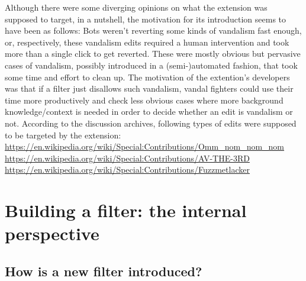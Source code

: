 Although there were some diverging opinions on what the extension was supposed to target, in a nutshell, the motivation for its introduction seems to have been as follows:
Bots weren't reverting some kinds of vandalism fast enough, or, respectively, these vandalism edits required a human intervention and took more than a single click to get reverted.
These were mostly obvious but pervasive cases of vandalism, possibly introduced in a (semi-)automated fashion, that took some time and effort to clean up.
The motivation of the extention's developers was that if a filter just disallows such vandalism, vandal fighters could use their time more productively and check less obvious cases where more background knowledge/context is needed in order to decide whether an edit is vandalism or not.
According to the discussion archives, following types of edits were supposed to be targeted by the extension:\\
\url{https://en.wikipedia.org/wiki/Special:Contributions/Omm_nom_nom_nom}\\
\url{https://en.wikipedia.org/wiki/Special:Contributions/AV-THE-3RD}\\
\url{https://en.wikipedia.org/wiki/Special:Contributions/Fuzzmetlacker}\\



\section{Building a filter: the internal perspective}
\subsection{How is a new filter introduced?}
\label{sec:introduce-a-filter}

